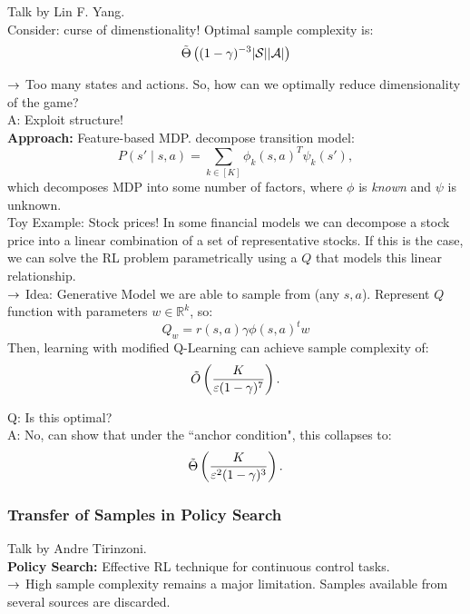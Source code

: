 Talk by Lin F. Yang. \\

Consider: curse of dimenstionality! Optimal sample complexity is:
\[
\tilde{\Theta}\left((1-\gamma)^{-3}|\mathcal{S}||\mathcal{A}|\right)
\]

$\rightarrow$ Too many states and actions. So, how can we optimally reduce dimensionality of the game?\\

A: Exploit structure! \\

{\bf Approach:} Feature-based MDP. decompose transition model:
\[
P(s' \mid s,a) = \sum_{k \in [K]} \phi_k(s,a)^T \psi_k(s'),
\]
which decomposes MDP into some number of factors, where $\phi$ is {\it known} and $\psi$ is unknown. \\

Toy Example: Stock prices! In some financial models we can decompose a stock price into a linear combination of a set of representative stocks. If this is the case, we can solve the RL problem parametrically using a $Q$ that models this linear relationship. \\

$\rightarrow$ Idea: Generative Model we are able to sample from (any $s,a$). Represent $Q$ function with parameters $w \in \mathbb{R}^k$, so:
\[
Q_w = r(s,a) \gamma \phi(s,a)^t w
\]
Then, learning with modified Q-Learning can achieve sample complexity of:
\[
\tilde{O}\left(\frac{K}{\varepsilon(1-\gamma)^7}\right).
\]

Q: Is this optimal? \\

A: No, can show that under the ``anchor condition", this collapses to:
\[
\tilde{\Theta}\left(\frac{K}{\varepsilon^2(1-\gamma)^3}\right).
\]

\spacerule

\subsubsection{Transfer of Samples in Policy Search~\cite{tirinzoni2019transfer}}

Talk by Andre Tirinzoni. \\

{\bf Policy Search:} Effective RL technique for continuous control tasks. \\

$\rightarrow$ High sample complexity remains a major limitation. Samples available from several sources are discarded. \\

